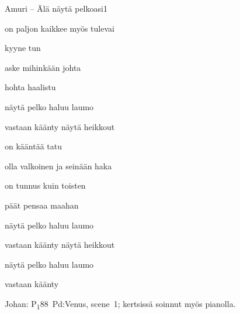 \documentclass[12pt,a4paper]{article}
\begin{document}
\thispagestyle{empty}
\begin{mysong}{Amuri – Älä näytä pelkoasi}{1}


\begin{SBVerse}
   on paljon kaikkee   myös
  tulevai

   kyyne  tun

   aske  mihinkään
  johta

   hohta 
  haalistu
\end{SBVerse}

\begin{SBChorus}
   näytä pelko  haluu laumo

   vastaan käänty  näytä
  heikkout
\end{SBChorus}


\begin{SBVerse}
   on kääntää  
  tatu

   olla valkoinen ja   seinään
  haka

   on tunnus  kuin toisten

   päät pensaa  maahan
\end{SBVerse}

\begin{SBChorus}
   näytä pelko  haluu laumo

   vastaan käänty  näytä
  heikkout

   näytä pelko  haluu laumo

   vastaan käänty
\end{SBChorus}


{\SBLyricNoteFont Johan: P\textsubscript{1}88~Pd:Venus, scene~1; kertsissä
soinnut myös pianolla.}

\end{mysong}
\end{document}
